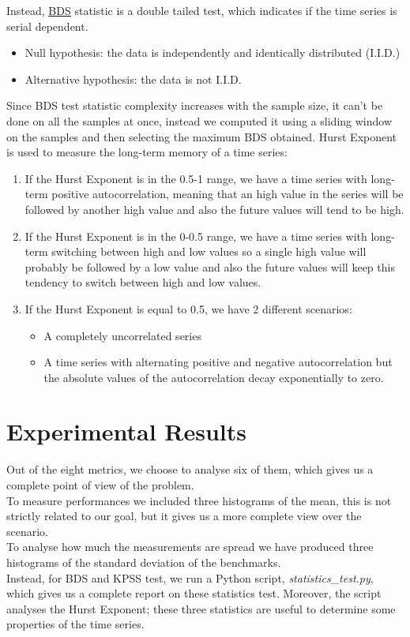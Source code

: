 Instead, \href{https://www.researchgate.net/publication/46554708_A_Fast_Algorithm_for_the_BDS_Statistic}{BDS} statistic is a double tailed test, which indicates if the time series is serial dependent.
\begin{itemize}
 	\item Null hypothesis: the data is independently and identically distributed (I.I.D.)
 	\item Alternative hypothesis: the data is not I.I.D.
\end{itemize}
Since BDS test statistic complexity increases with the sample size, it can't be done on all the samples at once, instead we computed it using a sliding window on the samples and then selecting the maximum BDS obtained.\newline
Hurst Exponent is used to measure the long-term memory of a time series:
\begin{enumerate}
	\item If the Hurst Exponent is in the 0.5-1 range, we have a time series with long-term positive autocorrelation, meaning that an high value in the series will be followed by another high value and also the future values will tend to be high.
	\item If the Hurst Exponent is in the 0-0.5 range, we have a time series with long-term switching between high and low values so a single high value will probably be followed by a low value and also the future values will keep this tendency to switch between high and low values.
	\item If the Hurst Exponent is equal to 0.5, we have 2 different scenarios:
	\begin{itemize}
		\item A completely uncorrelated series
		\item A time series with alternating positive and negative autocorrelation but the absolute values of the autocorrelation decay exponentially to zero.
	\end{itemize}
\end{enumerate}

\clearpage

\section{Experimental Results}

Out of the eight metrics, we choose to analyse six of them, which gives us a complete point of view of the problem.\\
To measure performances we included three histograms of the mean, this is not strictly related to our goal, but it gives us a more complete view over the scenario.\\
To analyse how much the measurements are spread we have produced three histograms of the standard deviation of the benchmarks.\\
Instead, for BDS and KPSS test, we run a Python script, \textit{statistics\_test.py}, which gives us a complete report on these statistics test. Moreover, the script analyses the Hurst Exponent; these three statistics are useful to determine some properties of the time series.
\clearpage
